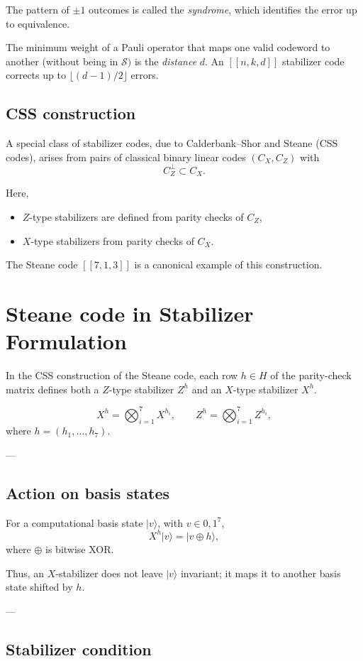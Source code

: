 The pattern of \(\pm 1\) outcomes is called the \emph{syndrome}, which identifies the error up to equivalence.

The minimum weight of a Pauli operator that maps one valid codeword to another (without being in \(\mathcal{S})\) is the \emph{distance} \(d\). An \([[n,k,d]]\) stabilizer code corrects up to \(\lfloor (d-1)/2 \rfloor\) errors.

\subsection*{CSS construction}
A special class of stabilizer codes, due to Calderbank--Shor and Steane (CSS codes), arises from pairs of classical binary linear codes \((C_X, C_Z)\) with
\[
C_Z^\perp \subset C_X.
\]

Here,
\begin{itemize}
\item \(Z\)-type stabilizers are defined from parity checks of \(C_Z\),
\item \(X\)-type stabilizers from parity checks of \(C_X\).
\end{itemize}

The Steane code \([[7,1,3]]\) is a canonical example of this construction.


\section{Steane code in Stabilizer Formulation}
In the CSS construction of the Steane code, each row \(h \in H\) of the parity-check matrix defines both a \(Z\)-type stabilizer \(Z^h\) and an \(X\)-type stabilizer \(X^h\).

\[
X^h = \bigotimes_{i=1}^7 X^{h_i},
\qquad
Z^h = \bigotimes_{i=1}^7 Z^{h_i},
\]
where \(h=(h_1,\dots,h_7)\).

---

\subsection{Action on basis states}

For a computational basis state \(|v\rangle\), with \(v\in {0,1}^7\),
\[
X^h |v\rangle = |v \oplus h\rangle,
\]
where \(\oplus\) is bitwise XOR.

Thus, an \(X\)-stabilizer does not leave \(|v\rangle\) invariant; it maps it to another basis state shifted by \(h\).

---

\subsection{Stabilizer condition}

